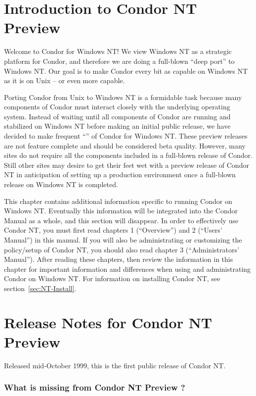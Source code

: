 
\section{Introduction to Condor NT Preview}

Welcome to Condor for Windows NT!  
We view Windows NT as a strategic platform for Condor, and therefore we are
doing a full-blown ``deep port'' to Windows NT.
Our goal is to make Condor every bit as capable on Windows NT as it is on
Unix -- or even more capable.  

Porting Condor from Unix to Windows NT is a formidable task because many
components of Condor must interact closely with the underlying operating
system.  Instead of waiting until all components of Condor are running and
stabilized on Windows NT before making an initial public release, we have
decided to make frequent ``'' of Condor for Windows
NT.  These preview releases are not feature complete and should be
considered beta quality.  However, many sites do not require all the
components included in a full-blown release of Condor.  Still other sites
may desire to get their feet wet with a preview release of Condor NT in
anticipation of setting up a production environment once a full-blown
release on Windows NT is completed.

This chapter contains additional information specific to running Condor on
Windows NT.  Eventually this information will be integrated into the Condor
Manual as a whole, and this section will disappear.  In order to effectively
use Condor NT, you must first read chapters 1 (``Overview'') and 2 (``Users'
Manual'') in this
manual.  If you will also be administrating or customizing the policy/setup of
Condor NT, you should also read chapter 3 (``Administrators' Manual'').
After reading these chapters, then review the information in this chapter
for important information and differences when using and administrating
Condor on Windows NT.  For information on installing Condor NT, see
section~\ref{sec:NT-Install}.


\section{Release Notes for Condor NT Preview \VersionNotice}

Released mid-October 1999, this is the first public release of Condor NT.

\subsubsection{What is missing from Condor NT Preview \VersionNotice?}

